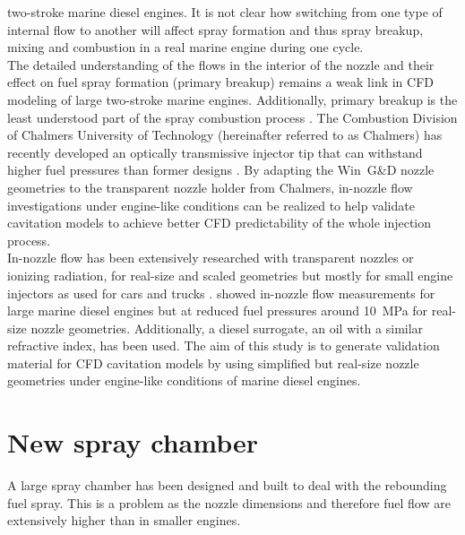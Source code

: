 \documentclass[letterpaper,twocolumn,10pt]{ilass}
\begin{document}
two-stroke marine diesel engines. It is not clear how switching from one type of internal
flow to another will affect spray formation and thus spray breakup, mixing and combustion
in a real marine engine during one cycle.\\
%
The detailed understanding of the flows in the interior of the nozzle and their effect on fuel
spray formation (primary breakup) remains a weak link in CFD modeling of large two-stroke marine
engines. Additionally, primary breakup is the least understood part of the spray combustion
process \cite{Fansler2015,Linne2013}. The Combustion Division of Chalmers University of
Technology (hereinafter referred to as Chalmers) has recently developed an optically
transmissive injector tip that can withstand higher fuel pressures than former designs
\cite{Falgout2015}. By adapting the Win~G\&D nozzle geometries to the transparent nozzle
holder from Chalmers, in-nozzle flow investigations under engine-like conditions can be
realized to help validate cavitation models to achieve better CFD predictability of the
whole injection process.\\
%
In-nozzle flow has been extensively researched with transparent nozzles or ionizing radiation,
for real-size and scaled geometries but mostly for small engine injectors as used for cars and
trucks \cite{Fansler2015, Blessing2003, Duke2014}.
\cite{Hult2016} showed in-nozzle flow measurements for large marine diesel engines but at
reduced fuel pressures around 10~MPa for real-size nozzle geometries. Additionally, a
diesel surrogate, an oil with a similar refractive index, has been used.
The aim of this study is to generate validation material for CFD cavitation models by
using simplified but real-size nozzle geometries under engine-like conditions of marine
diesel engines. 

\section*{New spray chamber}
A large spray chamber has been designed and built to deal with the rebounding fuel spray.
This is a problem as the nozzle dimensions and therefore fuel flow are extensively higher
than in smaller engines. 
\end{document}
